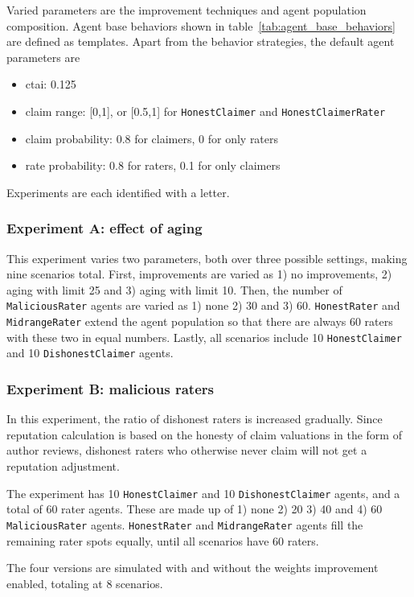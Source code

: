 \documentclass[%
    ]{\PathToTumTemplate/thesis/tum_thesis}
\begin{document}
Varied parameters are the improvement techniques and agent population composition.
Agent base behaviors shown in table~\ref{tab:agent_base_behaviors} are defined as templates.
Apart from the behavior strategies, the default agent parameters are
\begin{itemize}
	\item \gls{ctai}: 0.125
	\item claim range: [0,1], or [0.5,1] for  \texttt{HonestClaimer} and \texttt{HonestClaimerRater}
	\item claim probability: 0.8 for claimers, 0 for only raters
	\item rate probability: 0.8 for raters, 0.1 for only claimers
\end{itemize}

Experiments are each identified with a letter.

\subsubsection{Experiment A: effect of aging}
This experiment varies two parameters, both over three possible settings, making nine scenarios total.
First, improvements are varied as 1) no improvements, 2) aging with limit 25 and 3) aging with limit 10.
Then, the number of \texttt{MaliciousRater} agents are varied as 1) none 2) 30 and 3) 60.
\texttt{HonestRater} and \texttt{MidrangeRater} extend the agent population so that there are always 60 raters with these two in equal numbers.
Lastly, all scenarios include 10 \texttt{HonestClaimer} and 10 \texttt{DishonestClaimer} agents.

\subsubsection{Experiment B: malicious raters}
In this experiment, the ratio of dishonest raters is increased gradually.
Since reputation calculation is based on the honesty of claim valuations in the form of author reviews, dishonest raters who otherwise never claim will not get a reputation adjustment.

The experiment has 10 \texttt{HonestClaimer} and 10 \texttt{DishonestClaimer} agents, and a total of 60 rater agents.
These are made up of 1) none 2) 20 3) 40 and 4) 60 \texttt{MaliciousRater} agents.
\texttt{HonestRater} and \texttt{MidrangeRater} agents fill the remaining rater spots equally, until all scenarios have 60 raters.

The four versions are simulated with and without the weights improvement enabled, totaling at 8 scenarios.
\end{document}
